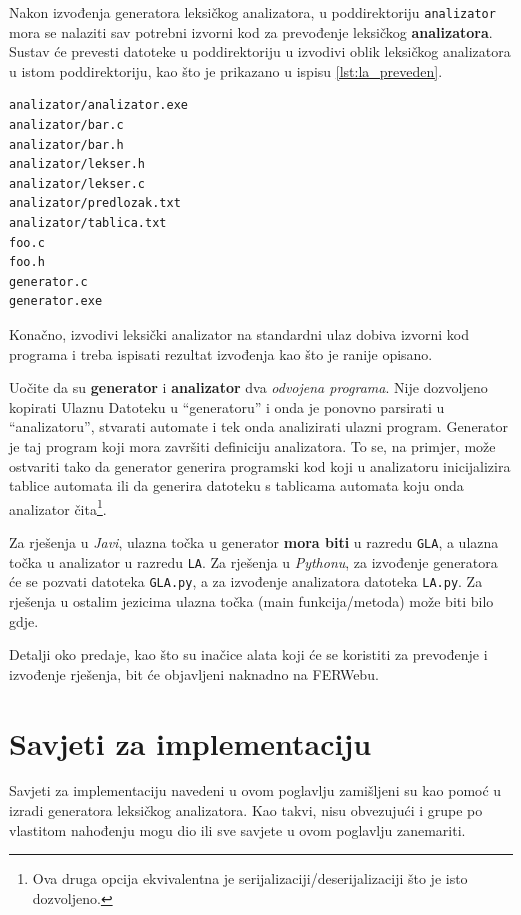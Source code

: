 \documentclass[times, 12pt, utf8]{book}
\begin{document}
Nakon izvođenja generatora leksičkog analizatora, u poddirektoriju \texttt{analizator} mora se nalaziti sav potrebni izvorni kod za prevođenje leksičkog \textbf{analizatora}.
Sustav će prevesti datoteke u poddirektoriju u izvodivi oblik leksičkog analizatora u istom poddirektoriju, kao što je prikazano u ispisu \ref{lst:la_preveden}.

\begin{lstlisting}[caption={Primjer sadržaja korijenskog direktorija nakon izvođenja generatora.},label=lst:la_preveden]
analizator/analizator.exe
analizator/bar.c
analizator/bar.h
analizator/lekser.h
analizator/lekser.c
analizator/predlozak.txt
analizator/tablica.txt
foo.c
foo.h
generator.c
generator.exe
\end{lstlisting}

Konačno, izvodivi leksički analizator na standardni ulaz dobiva izvorni kod programa i treba ispisati rezultat izvođenja kao što je ranije opisano.

Uočite da su \textbf{generator} i \textbf{analizator} dva \emph{odvojena programa}.
Nije dozvoljeno kopirati Ulaznu Datoteku u ``generatoru'' i onda je ponovno parsirati u ``analizatoru'', stvarati automate i tek onda analizirati ulazni program.
Generator je taj program koji mora završiti definiciju analizatora.
To se, na primjer, može ostvariti tako da generator generira programski kod koji u analizatoru inicijalizira tablice automata ili da generira datoteku s tablicama automata koju onda analizator čita\footnote{Ova druga opcija ekvivalentna je serijalizaciji/deserijalizaciji što je isto dozvoljeno.}.

Za rješenja u \emph{Javi}, ulazna točka u generator \textbf{mora biti} u razredu \texttt{GLA}, a ulazna točka u analizator u razredu \texttt{LA}.
Za rješenja u \emph{Pythonu}, za izvođenje generatora će se pozvati datoteka \texttt{GLA.py}, a za izvođenje analizatora datoteka \texttt{LA.py}.
Za rješenja u ostalim jezicima ulazna točka (main funkcija\slash{}metoda) može biti bilo gdje.

Detalji oko predaje, kao što su inačice alata koji će se koristiti za prevođenje i izvođenje rješenja, bit će objavljeni naknadno na FERWebu.

\section{Savjeti za implementaciju}
Savjeti za implementaciju navedeni u ovom poglavlju zamišljeni su kao pomoć u izradi generatora leksičkog analizatora.
Kao takvi, nisu obvezujući i grupe po vlastitom nahođenju mogu dio ili sve savjete u ovom poglavlju zanemariti.
\end{document}
